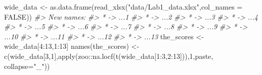 \documentclass[
]{book}
\newenvironment{Shaded}{\begin{snugshade}}{\end{snugshade}}
\newcommand{\AttributeTok}[1]{\textcolor[rgb]{0.77,0.63,0.00}{#1}}
\newcommand{\CommentTok}[1]{\textcolor[rgb]{0.56,0.35,0.01}{\textit{#1}}}
\newcommand{\ConstantTok}[1]{\textcolor[rgb]{0.00,0.00,0.00}{#1}}
\newcommand{\DecValTok}[1]{\textcolor[rgb]{0.00,0.00,0.81}{#1}}
\newcommand{\FunctionTok}[1]{\textcolor[rgb]{0.00,0.00,0.00}{#1}}
\newcommand{\NormalTok}[1]{#1}
\newcommand{\OtherTok}[1]{\textcolor[rgb]{0.56,0.35,0.01}{#1}}
\newcommand{\SpecialCharTok}[1]{\textcolor[rgb]{0.00,0.00,0.00}{#1}}
\newcommand{\StringTok}[1]{\textcolor[rgb]{0.31,0.60,0.02}{#1}}
\theoremstyle{definition}
\theoremstyle{definition}
\theoremstyle{definition}
\theoremstyle{definition}
\theoremstyle{remark}
\begin{document}
\begin{Shaded}
\begin{Highlighting}[]
\NormalTok{wide\_data }\OtherTok{\textless{}{-}} \FunctionTok{as.data.frame}\NormalTok{(}\FunctionTok{read\_xlsx}\NormalTok{(}\StringTok{"data/Lab1\_data.xlsx"}\NormalTok{,}\AttributeTok{col\_names =} \ConstantTok{FALSE}\NormalTok{))}
\CommentTok{\#\textgreater{} New names:}
\CommentTok{\#\textgreater{} * \textasciigrave{}\textasciigrave{} {-}\textgreater{} \textasciigrave{}...1\textasciigrave{}}
\CommentTok{\#\textgreater{} * \textasciigrave{}\textasciigrave{} {-}\textgreater{} \textasciigrave{}...2\textasciigrave{}}
\CommentTok{\#\textgreater{} * \textasciigrave{}\textasciigrave{} {-}\textgreater{} \textasciigrave{}...3\textasciigrave{}}
\CommentTok{\#\textgreater{} * \textasciigrave{}\textasciigrave{} {-}\textgreater{} \textasciigrave{}...4\textasciigrave{}}
\CommentTok{\#\textgreater{} * \textasciigrave{}\textasciigrave{} {-}\textgreater{} \textasciigrave{}...5\textasciigrave{}}
\CommentTok{\#\textgreater{} * \textasciigrave{}\textasciigrave{} {-}\textgreater{} \textasciigrave{}...6\textasciigrave{}}
\CommentTok{\#\textgreater{} * \textasciigrave{}\textasciigrave{} {-}\textgreater{} \textasciigrave{}...7\textasciigrave{}}
\CommentTok{\#\textgreater{} * \textasciigrave{}\textasciigrave{} {-}\textgreater{} \textasciigrave{}...8\textasciigrave{}}
\CommentTok{\#\textgreater{} * \textasciigrave{}\textasciigrave{} {-}\textgreater{} \textasciigrave{}...9\textasciigrave{}}
\CommentTok{\#\textgreater{} * \textasciigrave{}\textasciigrave{} {-}\textgreater{} \textasciigrave{}...10\textasciigrave{}}
\CommentTok{\#\textgreater{} * \textasciigrave{}\textasciigrave{} {-}\textgreater{} \textasciigrave{}...11\textasciigrave{}}
\CommentTok{\#\textgreater{} * \textasciigrave{}\textasciigrave{} {-}\textgreater{} \textasciigrave{}...12\textasciigrave{}}
\CommentTok{\#\textgreater{} * \textasciigrave{}\textasciigrave{} {-}\textgreater{} \textasciigrave{}...13\textasciigrave{}}
\NormalTok{the\_scores }\OtherTok{\textless{}{-}}\NormalTok{ wide\_data[}\DecValTok{4}\SpecialCharTok{:}\DecValTok{13}\NormalTok{,}\DecValTok{1}\SpecialCharTok{:}\DecValTok{13}\NormalTok{]}
\FunctionTok{names}\NormalTok{(the\_scores) }\OtherTok{\textless{}{-}} \FunctionTok{c}\NormalTok{(wide\_data[}\DecValTok{3}\NormalTok{,}\DecValTok{1}\NormalTok{],}\FunctionTok{apply}\NormalTok{(zoo}\SpecialCharTok{::}\FunctionTok{na.locf}\NormalTok{(}\FunctionTok{t}\NormalTok{(wide\_data[}\DecValTok{1}\SpecialCharTok{:}\DecValTok{3}\NormalTok{,}\DecValTok{2}\SpecialCharTok{:}\DecValTok{13}\NormalTok{])),}\DecValTok{1}\NormalTok{,paste, }\AttributeTok{collapse=}\StringTok{"\_"}\NormalTok{))}


\end{Highlighting}
\end{Shaded}
\end{document}
